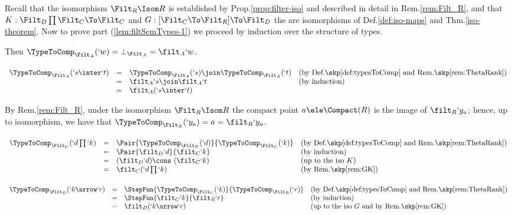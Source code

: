 \documentclass{lmcs}
\begin{document}
 \begin{Proof} Recall that the isomorphism $\Filt_R\Isom R$ is established by Prop.\skp\ref{prop:filter-iso} and described in detail in Rem.\skp\ref{rem:Filt_R}, and that $K:\Filt_D\prod\Filt_C \To \Filt_C$ and
$G:[\Filt_C\To\Filt_R]\To \Filt_D$ the are isomorphisms of Def.\skp\ref{def:iso-maps} and Thm.\skp\ref{iso-theorem}. Now
to prove part (\ref{lem:filtSemTypes-1}) we proceed by induction over the structure of types. %
 \begin{description} \itemsep 2pt

 \item [$ `s \equiv `w $] 
Then $\TypeToComp_{\Filt_A}(`w) = \bot_{\Filt_A} = \filt_A`w$.

 \item [$ `s \equiv `s\inter`t $] 
%
 $ \begin{array}[t]{rcl@{\quad}l}
\TypeToComp_{\Filt_A}(`s\inter`t) & = & \TypeToComp_{\Filt_A}(`s) \join \TypeToComp_{\Filt_A}(`t) & 
(\textrm{by Def.\skp\ref{def:typesToComp} and Rem.\skp\ref{rem:ThetaRank}}) \\ %
	& = & \filt_A `s \join \filt_A`t & (\textrm{by induction}) \\ %
	& = & \filt_A(`s\inter`t)
 \end{array} $

 \item [$ `s \equiv `y_a $] 
By Rem.\skp\ref{rem:Filt_R}, under the isomorphism $\Filt_R\Isom R$ the compact point $a\ele \Compact(R)$ is the image of $\filt_R`y_a$; hence, up to isomorphism, we have that $\TypeToComp_{\Filt_R}(`y_a)= a =\filt_R`y_a$.

 \item [$ `s \equiv `d\prod`k $] 
%
 $ \begin{array}[t]{rcl@{\quad}l}
 \TypeToComp_{\Filt_C}(`d\prod`k) & = & \Pair{\TypeToComp_{\Filt_D }(`d)}{\TypeToComp_{\Filt_C}(`k)} & 
	(\textrm{by Def.\skp\ref{def:typesToComp} and Rem.\skp\ref{rem:ThetaRank}}) \\ %
	& = & \Pair{\filt_D`d}{\filt_C`k} & (\textrm{by induction}) \\ %
	& = & (\filt_D`d) \cons \ (\filt_C`k) & (\textrm{up to the iso } K ) \\ %
	& = & \filt_C(`d\prod`k) & (\textrm{by Rem.\skp\ref{rem:GK}}) 
 \end{array} $

 \item [$ `s \equiv `k\arrow `r $] 
%
 $ \begin{array}[t]{rcl@{\quad}l}
 \TypeToComp_{\Filt_D }(`k\arrow `r) & = & \StepFun{\TypeToComp_{\Filt_C}(`k)}{\TypeToComp_{\Filt_R}(`r)} &
	(\textrm{by Def.\skp\ref{def:typesToComp} and Rem.\skp\ref{rem:ThetaRank}}) \\ %
	& = & \StepFun{\filt_C`k}{\filt_R`r} & (\textrm{by induction}) \\ %
	& = & \filt_D(`k\arrow `r) & (\textrm{up to the iso $G$ and by Rem.\skp\ref{rem:GK}})
 \end{array} $
	

\end{description}
\end{Proof}
\end{document}
